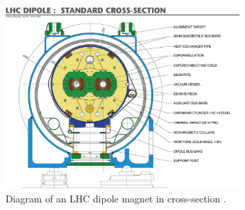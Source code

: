 \begin{figure}
\centering
\includegraphics[width=0.8\textwidth]{figures/lhc_and_cms/lhc_dipole.jpg}
\caption{Diagram of an LHC dipole magnet in cross-section \cite{lhc_dipole}.}
\label{lhc_dipole}
\end{figure}